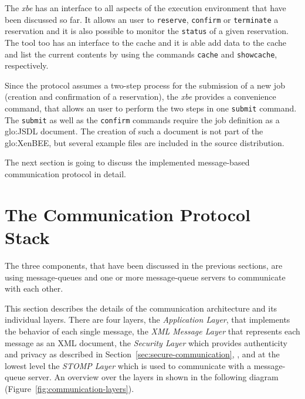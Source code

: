The  \emph{xbe}  has  an  interface   to  all  aspects  of  the  execution
environment  that  have been  discussed  so far.   It  allows  an user  to
\texttt{reserve}, \texttt{confirm} or \texttt{terminate} a reservation and
it  is   also  possible  to   monitor  the  \texttt{status}  of   a  given
reservation. The tool too has an interface to the cache and it is able add
data to  the cache  and list  the current contents  by using  the commands
\texttt{cache} and \texttt{showcache}, respectively.

Since the protocol assumes a two-step  process for the submission of a new
job  (\ie creation  and  confirmation of  a  reservation), the  \emph{xbe}
provides a  convenience command,  that allows an  user to perform  the two
steps in one  \texttt{submit} command. The \texttt{submit} as  well as the
\texttt{confirm} commands  require the job definition  as a \gls{glo:JSDL}
document.   The  creation   of  such  a  document  is   not  part  of  the
\gls{glo:XenBEE},  but several example  files are  included in  the source
distribution.

\medskip

The  next  section  is  going  to discuss  the  implemented  message-based
communication protocol in detail.

\section{The Communication Protocol Stack}
\label{sec:communication-protocol}

The three components,  that have been discussed in  the previous sections,
are  using  message-queues  and  one  or  more  message-queue  servers  to
communicate with each other.

This section  describes the details of the  communication architecture and
its  individual  layers.  There  are  four  layers, the  \emph{Application
  Layer},  that  implements  the  behavior  of each  single  message,  the
\emph{XML Message Layer} that represents  each message as an XML document,
the  \emph{Security  Layer} which  provides  authenticity  and privacy  as
described            in            Section~\ref{sec:secure-communication},
\emph{},  and at  the  lowest level  the
\emph{STOMP  Layer} which  is  used to  communicate  with a  message-queue
server.  An overview over  the layers  in shown  in the  following diagram
(Figure~\ref{fig:communication-layers}).

\medskip

